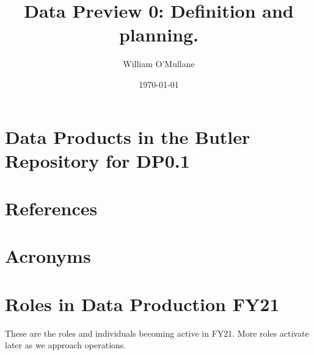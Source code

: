 \documentclass[OPS,authoryear]{lsstdoc}
\title{Data Preview 0: Definition and planning.}
\author{%
William O'Mullane
}
\date{\today}
\begin{document}

\mkshorttitle





\appendix

\section{Data Products in the Butler Repository for DP0.1} \label{sec:dp01butler}

\section{References} \label{sec:bib}
\renewcommand{\refname}{}


\section{Acronyms} \label{sec:acronyms}


\section {Roles in Data Production FY21}
These are the roles and individuals becoming active in FY21.
More roles activate later as we approach operations.

\end{document}
